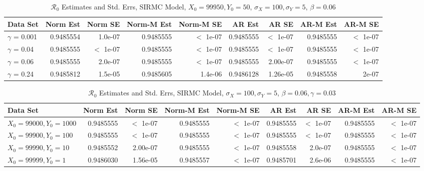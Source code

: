 \message{ !name(draft_v13.tex)}\documentclass[12pt]{article}
\newcommand{\rr}{\ensuremath{\mathcal{R}_0}}
\begin{document}
\begin{table}[H]
	
	\caption{\label{tab:}$\rr$ Estimates and Std. Errs, SIRMC Model,
		$X_0 = 99950, Y_0 = 50$, $\sigma_X = 100, \sigma_Y = 5$, $\beta = 0.06$}
	\centering
	\begin{footnotesize}
		\begin{tabular}[t]{l|r|r|r|r|r|r|r|r}
			\hline
			Data Set & Norm Est & Norm SE & Norm-M Est & Norm-M SE & AR Est & AR SE & AR-M Est & AR-M SE\\
			\hline
			$\gamma$ = 0.001 & 0.9485554 & 1.0e-07 & 0.9485555 & $<$ 1e-07 & 0.9485555 & $<$ 1e-07 & 0.9485555 & $<$ 1e-07\\
			\hline
			$\gamma$ = 0.04 & 0.9485555 & $<$ 1e-07 & 0.9485555 & $<$ 1e-07 & 0.9485555 & $<$ 1e-07 & 0.9485555 & $<$ 1e-07\\
			\hline
			$\gamma$ = 0.06 & 0.9485555 & 2.0e-07 & 0.9485555 & $<$ 1e-07 & 0.9485555 & 2.00e-07 & 0.9485555 & $<$ 1e-07\\
			\hline
			$\gamma$ = 0.24 & 0.9485812 & 1.5e-05 & 0.9485605 & 1.4e-06 & 0.9486128 & 1.26e-05 & 0.9485558 & 2e-07\\
			\hline
		\end{tabular}
	\end{footnotesize}
\end{table}

\begin{table}[H]
	
	\caption{\label{tab:}$\rr$ Estimates and Std. Errs, SIRMC Model,
		$\sigma_X = 100, \sigma_Y = 5$, $\beta = 0.06, \gamma = 0.03$}
	\centering
	\begin{footnotesize}
		\begin{tabular}[t]{l|r|r|r|r|r|r|r|r}
			\hline
			Data Set & Norm Est & Norm SE & Norm-M Est & Norm-M SE & AR Est & AR SE & AR-M Est & AR-M SE\\
			\hline
			$X_0 = 99000, Y_0 = 1000$ & 0.9485555 & $<$ 1e-07 & 0.9485555 & $<$ 1e-07 & 0.9485555 & $<$ 1e-07 & 0.9485555 & $<$ 1e-07\\
			\hline
			$X_0 = 99900, Y_0 = 100$ & 0.9485555 & $<$ 1e-07 & 0.9485555 & $<$ 1e-07 & 0.9485555 & $<$ 1e-07 & 0.9485555 & $<$ 1e-07\\
			\hline
			$X_0 = 99990, Y_0 = 10$ & 0.9485552 & 2.00e-07 & 0.9485555 & $<$ 1e-07 & 0.9485558 & 2.0e-07 & 0.9485555 & $<$ 1e-07\\
			\hline
			$X_0 = 99999, Y_0 = 1$ & 0.9486030 & 1.56e-05 & 0.9485557 & $<$ 1e-07 & 0.9485701 & 2.6e-06 & 0.9485555 & $<$ 1e-07\\
			\hline
		\end{tabular}
	\end{footnotesize}
\end{table}
\end{document}
